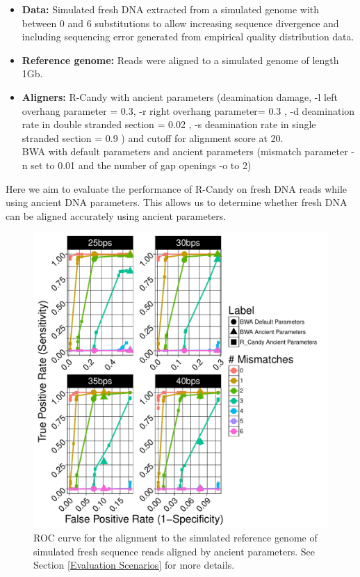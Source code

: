 \documentclass[11pt,a4paper]{report}
\begin{document}
 \label {Alignment of Simulated Fresh DNA Reads to a Simulated Genome with
 ancient parameters.}
 

  \begin{itemize}

   \item \textbf{Data:} Simulated fresh DNA extracted from a simulated genome 
   with between 0 and 6 substitutions to allow increasing sequence divergence
   and including sequencing error generated from empirical quality distribution 
   data.
 
   
   \item \textbf{Reference genome:} Reads were aligned to a simulated genome of 
   length 1Gb.

    \item \textbf{Aligners:}
    R-Candy with ancient parameters (deamination damage, -l left overhang 
    parameter = 0.3, -r right overhang parameter= 0.3 , -d deamination rate 
    in double stranded section = 0.02 , -s deamination rate in single stranded 
    section = 0.9 ) and cutoff for alignment score at 20. \\
    BWA with default parameters and ancient parameters \cite{green2010draft}
    (mismatch parameter -n set to 0.01 and the number of gap openings -o to 2)
   
   \end{itemize}
 
Here we aim to evaluate the performance of R-Candy on fresh DNA reads while 
using ancient DNA parameters. This allows us to determine whether fresh DNA
can be aligned accurately using ancient parameters. 


\begin{figure}[H]
\centering
\includegraphics[width=12cm]{pictures/f_DS8_emp.pdf}
\caption{ ROC curve for the alignment to the simulated reference genome of 
simulated fresh sequence reads aligned by ancient parameters. See Section 
\ref{Evaluation Scenarios} for more details.}
\label{DS8_emp}
\end{figure}
\end{document}
